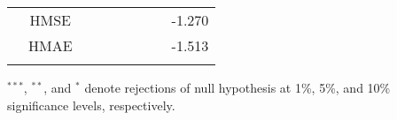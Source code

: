 \documentclass[10pt]{article}
\begin{document}
\begin{landscape}
\begin{center}
\begin{tabular}{c|c|ccccccc}
                       &  HMSE          &                    &                                &                                  &                                  &                                     &                                    &-1.270             \\
                       &  HMAE          &                    &                                &                                  &                                  &                                     &                                   &-1.513             \\  \hline \\
   \end{tabular}
\end{center}
$^{***}$, $^{**}$, and $^{*}$ denote rejections of null hypothesis at 1\%, 5\%, and 10\% significance levels, respectively.
\end{landscape}
\end{document}
